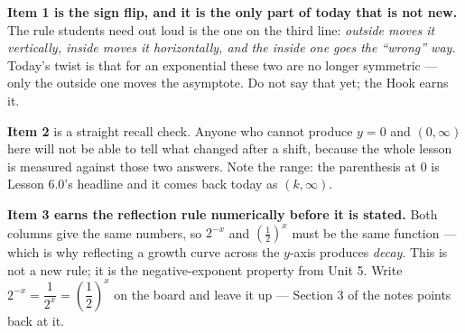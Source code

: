 \documentclass[10pt]{article}
\begin{document}
\begin{teachernote}
\textbf{Item 1 is the sign flip, and it is the only part of today that is not new.} The rule students
need out loud is the one on the third line: \emph{outside moves it vertically, inside moves it
horizontally, and the inside one goes the ``wrong'' way.} Today's twist is that for an exponential
these two are no longer symmetric --- only the outside one moves the asymptote. Do not say that yet;
the Hook earns it.

\textbf{Item 2} is a straight recall check. Anyone who cannot produce $y=0$ and $(0,\infty)$ here
will not be able to tell what changed after a shift, because the whole lesson is measured against
those two answers. Note the range: the parenthesis at $0$ is Lesson 6.0's headline and it comes back
today as $(k,\infty)$.

\textbf{Item 3 earns the reflection rule numerically before it is stated.} Both columns give the same
numbers, so $2^{-x}$ and $\left(\frac12\right)^{x}$ must be the same function --- which is why
reflecting a growth curve across the $y$-axis produces \emph{decay}. This is not a new rule; it is
the negative-exponent property from Unit 5. Write $2^{-x}=\dfrac{1}{2^{x}}=\left(\dfrac12\right)^{x}$
on the board and leave it up --- Section 3 of the notes points back at it.
\end{teachernote}
\end{document}
